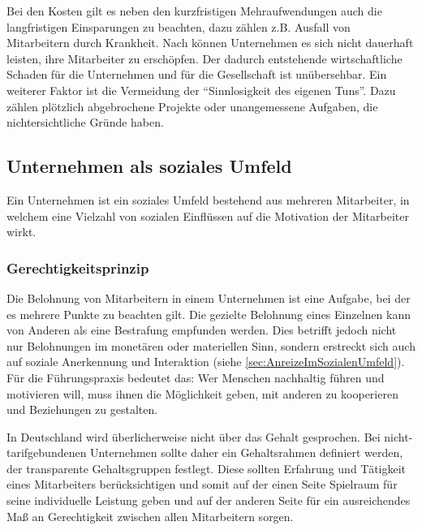 Bei den Kosten gilt es neben den kurzfristigen Mehraufwendungen auch die langfristigen Einsparungen zu beachten, dazu zählen z.B. Ausfall von Mitarbeitern durch Krankheit. Nach \citet{Schlolaut.2013} können Unternehmen es sich nicht dauerhaft leisten, ihre Mitarbeiter zu erschöpfen. Der dadurch entstehende wirtschaftliche Schaden für die Unternehmen und für die Gesellschaft ist unübersehbar. Ein weiterer Faktor ist die Vermeidung der “Sinnlosigkeit des eigenen Tuns”. Dazu zählen plötzlich abgebrochene Projekte oder unangemessene Aufgaben, die nichtersichtliche Gründe haben.

\subsection{Unternehmen als soziales Umfeld}
Ein Unternehmen ist ein soziales Umfeld bestehend aus mehreren Mitarbeiter, in welchem eine Vielzahl von sozialen Einflüssen auf die Motivation der Mitarbeiter wirkt. 

\subsubsection{Gerechtigkeitsprinzip}
Die Belohnung von Mitarbeitern in einem Unternehmen ist eine Aufgabe, bei der es mehrere Punkte zu beachten gilt. Die gezielte Belohnung eines Einzelnen kann von Anderen als eine Bestrafung empfunden werden. Dies betrifft jedoch nicht nur Belohnungen im monetären oder materiellen Sinn, sondern erstreckt sich auch auf soziale Anerkennung und Interaktion (siehe \ref{sec:AnreizeImSozialenUmfeld}). \glqq Für die Führungspraxis bedeutet das: Wer Menschen nachhaltig führen und motivieren will, muss ihnen die Möglichkeit geben, mit anderen zu kooperieren und Beziehungen zu gestalten.\grqq \cite[S. 18]{Seelbach.2011} 

In Deutschland wird überlicherweise nicht über das Gehalt gesprochen. Bei nicht-tarifgebundenen Unternehmen sollte daher ein Gehaltsrahmen definiert werden, der transparente Gehaltsgruppen festlegt. Diese sollten Erfahrung und Tätigkeit eines Mitarbeiters berücksichtigen und somit auf der einen Seite Spielraum für seine individuelle Leistung geben und auf der anderen Seite für ein ausreichendes Maß an Gerechtigkeit zwischen allen Mitarbeitern sorgen. 

